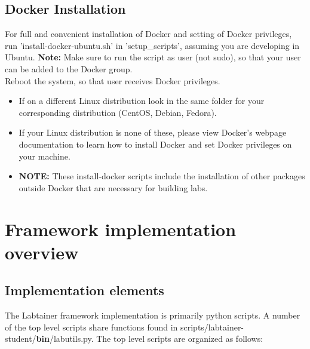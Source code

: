 \documentclass[12pt]{article}
\begin{document}
\subsection{Docker Installation}
For full and convenient installation of Docker and setting of Docker privileges, run  'install-docker-ubuntu.sh' in 'setup\_scripts', assuming you are developing in Ubuntu. {\bf Note:} Make sure to run the script as user (not sudo), so that your user can be added to the Docker group.\\ 
    
\noindent Reboot the system, so that user receives Docker privileges.

    \begin {itemize}
    \item If on a different Linux distribution look in the same folder for your corresponding distribution (CentOS, Debian, Fedora). 
    \item If your Linux distribution is none of these, please view Docker's webpage documentation to learn how to install Docker and set Docker privileges on your machine.
    \item {\bf NOTE:} These install-docker scripts include the installation of other packages outside Docker that are necessary for building labs. 
    \end {itemize}



\section {Framework implementation overview}
\subsection{Implementation elements}
The Labtainer framework implementation is primarily python scripts.  A number of the 
top level scripts share functions found in scripts/labtainer-student/{\bf bin}/labutils.py.  The 
top level scripts are organized as follows:
\end{document}
